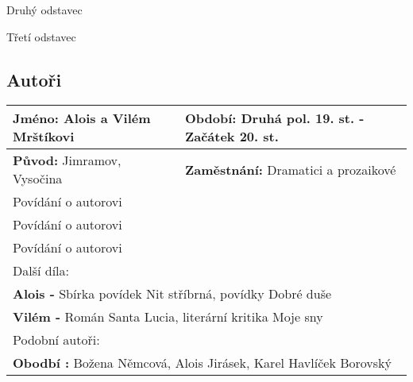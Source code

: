 Druhý odstavec

Třetí odstavec
\subsection*{Autoři}
\begin{tabularx}{\linewidth}{l|l}
    \textbf{Jméno:} Alois a Vilém Mrštíkovi & \textbf{Období:} Druhá pol. 19. st. - Začátek 20. st. \\
    \hline
    \textbf{Původ:} Jimramov, Vysočina      & \textbf{Zaměstnání:} Dramatici a prozaikové           \\
    \hline
    \multicolumn{2}{l}{Povídání o autorovi}                                                         \\
    \multicolumn{2}{l}{Povídání o autorovi}                                                         \\
    \multicolumn{2}{l}{Povídání o autorovi}                                                         \\
    \hline
    \multicolumn{2}{l}{Další díla:}                                                                 \\
    \multicolumn{2}{l}{\textbf{Alois -} Sbírka povídek Nit stříbrná, povídky Dobré duše}            \\
    \multicolumn{2}{l}{\textbf{Vilém -} Román Santa Lucia, literární kritika Moje sny}               \\
    \hline
    \multicolumn{2}{l}{Podobní autoři:}                                                             \\
    \multicolumn{2}{l}{\textbf{Obodbí :} Božena Němcová, Alois Jirásek, Karel Havlíček Borovský}    \\
\end{tabularx}
